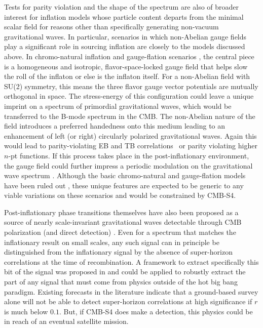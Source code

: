 Tests for parity violation and the shape of the spectrum are also of broader interest for inflation models whose particle content departs from the minimal scalar field for reasons other than specifically generating non-vacuum gravitational waves. In particular, scenarios in which non-Abelian gauge fields play a significant role in sourcing inflation are closely to the models discussed above. In chromo-natural inflation and gauge-flation scenarios \cite{Maleknejad:2011jw,Adshead:2012kp,Adshead:2012qe,Adshead:2013qp,Adshead:2013nka,Dimastrogiovanni:2012st,Dimastrogiovanni:2012ew}, the central piece is a homogeneous and isotropic, flavor-space-locked gauge field that helps slow the roll of the inflaton or else is the inflaton itself. For a non-Abelian field with SU(2) symmetry, this means the three flavor gauge vector potentials are mutually orthogonal in space. The stress-energy of this configuration could leave a unique imprint on a spectrum of primordial gravitational waves, which would be transferred to the B-mode spectrum in the CMB. The non-Abelian nature of the field introduces a preferred handedness onto this medium leading to an enhancement of left (or right) circularly polarized gravitational waves. Again this would lead to parity-violating EB and TB correlations~\cite{Lue:1998mq,Gluscevic:2010vv} or parity violating higher $n$-pt functions. If this process takes place in the post-inflationary environment, the gauge field could further impress a periodic modulation on the gravitational wave spectrum \cite{Bielefeld:2014nza,Bielefeld:2015daa}. Although the basic chromo-natural and gauge-flation models have been ruled out \cite{Namba:2013kia}, these unique features are expected to be generic to any viable variations on these scenarios and would be constrained by CMB-S4.

Post-inflationary phase transitions themselves have also been proposed as a source of nearly scale-invariant gravitational waves detectable through CMB polarization (and direct detection) \cite{Krauss:1991qu,JonesSmith:2007ne,Giblin:2011yh,Figueroa:2012kw,Fenu:2013tea}. Even for a spectrum that matches the inflationary result on small scales, any such signal can in principle be distinguished from the inflationary signal by the absence of super-horizon correlations at the time of recombination. A framework to extract specifically this bit of the signal was proposed in \cite{Baumann:2009mq} and could be applied to robustly extract the part of any signal that must come from physics outside of the hot big bang paradigm. Existing forecasts in the literature \cite{Lee:2014cya} indicate that a ground-based survey alone will not be able to detect super-horizon correlations at high significance if $r$ is much below $0.1$. But, if CMB-S4 does make a detection, this physics could be in reach of an eventual satellite mission.

